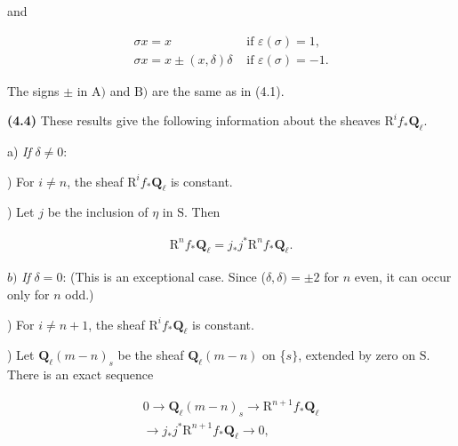\documentclass[10pt,leqno]{article}
\begin{document}
\noindent and\par

\[\begin{array}{ll}\sigma x = x&\text{ if }\varepsilon (\sigma )=1,\\\sigma x = x \pm  (x,\delta )\delta &\text{ if }\varepsilon (\sigma )=- 1.\end{array}\]

\noindent The signs \(\pm \) in \(\mathrm{A})\) and \(\mathrm{B})\) are the same as in (4.1).\par

\noindent \textbf{(4.4)} These results give the following information about the sheaves \(\mathrm{R}^{i} f_{*}\mathbf{Q}_{\ell }\).\par

\noindent a) \emph{If} \(\delta \ne 0\):\par

) For \(i\ne n\), the sheaf \(\mathrm{R}^{i} f_{*}\mathbf{Q}_{\ell }\) is constant.\par

) Let \(j\) be the inclusion of \(\eta \) in \(\mathrm{S}\). Then\par

\begin{equation*}\begin{gathered}\mathrm{R}^{n} f_{*}\mathbf{Q}_{\ell } = j_{*}j^{*}\mathrm{R}^{n} f_{*}\mathbf{Q}_{\ell }.\end{gathered}\end{equation*}

\noindent \(b)\) \emph{If} \(\delta =0\): (This is an exceptional case. Since (\(\delta ,\delta )=\pm 2\) for \(n\) even, it can occur only for \(n\) odd.)\par

) For \(i\ne n+1\), the sheaf \(\mathrm{R}^{i} f_{*}\mathbf{Q}_{\ell }\) is constant.\par

) Let \(\mathbf{Q}_{\ell }(m- n)_{s}\) be the sheaf \(\mathbf{Q}_{\ell }(m- n)\) on \{\(s\}\), extended by zero on \(\mathrm{S}\). There is an exact sequence\par

\begin{equation*}\begin{gathered}0 \longrightarrow  \mathbf{Q}_{\ell }(m- n)_{s} \longrightarrow  \mathrm{R}^{n+1}f_{*}\mathbf{Q}_{\ell } \\ \longrightarrow  j_{*}j^{*}\mathrm{R}^{n+1}f_{*}\mathbf{Q}_{\ell } \longrightarrow  0,\end{gathered}\end{equation*}
\end{document}
